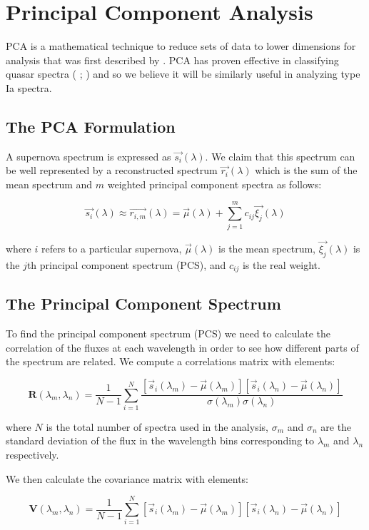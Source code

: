 \section{Principal Component Analysis}
PCA is a mathematical technique to reduce sets of data to lower dimensions for analysis that was first described by \citet{pearson01a}. PCA has proven effective in classifying quasar spectra (\citeauthor{suzuki05b} \citeyear{suzuki05b}; \citeauthor{suzuki05a} \citeyear{suzuki05a}) and so we believe it will be similarly useful in analyzing type Ia spectra.

\subsection{The PCA Formulation}
A supernova spectrum is expressed as $\vec{s_{i}}(\lambda)$. We claim that this spectrum can be well represented by a reconstructed spectrum $\vec{r_{i}}(\lambda)$ which is the sum of the mean spectrum and $m$ weighted principal component spectra as follows:

$$\vec{s_{i}}(\lambda) \approx \vec{r_{i,m}}(\lambda) = \vec{\mu}(\lambda) + \sum_{j=1}^{m} c_{ij} \vec{\xi_{j}}(\lambda)$$

where $i$ refers to a particular supernova, $\vec{\mu}(\lambda)$ is the mean spectrum, $\vec{\xi_{j}}(\lambda)$ is the $j$th principal component spectrum (PCS), and $c_{ij}$ is the real weight.

\subsection{The Principal Component Spectrum}
To find the principal component spectrum (PCS) we need to calculate the correlation of the fluxes at each wavelength in order to see how different parts of the spectrum are related. We compute a correlations matrix with elements:

$$  \textbf{R}(\lambda_{m},\lambda_{n}) = \frac{1}{N-1} \sum_{i=1}^{N} \frac{[\vec{s}_{i}(\lambda_{m}) - \vec{\mu}(\lambda_{m})][\vec{s}_{i}(\lambda_{n}) - \vec{\mu}(\lambda_{n})]}{\sigma(\lambda_{m})\sigma(\lambda_{n})} $$

where $N$ is the total number of spectra used in the analysis, $\sigma_{m}$ and $\sigma_{n}$ are the standard deviation of the flux in the wavelength bins corresponding to $\lambda_{m}$ and $\lambda_{n}$ respectively.

We then calculate the covariance matrix with elements:

$$ \textbf{V}(\lambda_{m},\lambda_{n}) = \frac{1}{N-1} \sum_{i=1}^{N} [\vec{s}_{i}(\lambda_{m}) - \vec{\mu}(\lambda_{m})][\vec{s}_{i}(\lambda_{n}) - \vec{\mu}(\lambda_{n})] $$

